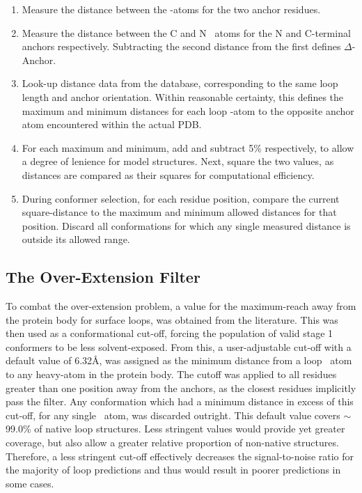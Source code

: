 \begin{enumerate} \isep
\item Measure the distance between the \ca-atoms for the two anchor residues.
\item Measure the distance between the C and N \mainchain\ atoms for the N and C-terminal anchors respectively. Subtracting the second distance from the first defines $\Delta$-Anchor.
\item Look-up distance data from the database, corresponding to the same loop length and anchor orientation. Within reasonable certainty, this defines the maximum and minimum distances for each loop \ca-atom to the opposite anchor atom encountered within the actual PDB. 
\item For each maximum and minimum, add and subtract 5\% respectively, to allow a degree of lenience for model structures. Next, square the two values, as distances are compared as their squares
for computational efficiency.\item During conformer selection, for each residue position, compare the current square-distance to the maximum and minimum allowed distances for that position. Discard all conformations for which any single measured distance is outside its allowed range.
\end{enumerate}

\subsection{The Over-Extension Filter}
\label{section:arcus:overExtFilter}

To combat the over-extension problem, a value for the maximum-reach away from the protein body for surface loops,  was obtained from the literature\cite{METHOD:Plop}. This was then used as a conformational cut-off, forcing the population of valid stage 1 conformers to be less solvent-exposed.
From this, a user-adjustable cut-off with a default value of 6.32\AA, was assigned as the minimum distance from a loop \mainchain\ atom to any heavy-atom in the protein body. The cutoff was applied to all residues greater than one position away from the anchors, as the closest residues implicitly pass the filter. Any conformation which had a minimum distance in excess of this cut-off, for any single \mainchain\ atom, was discarded outright. This default value covers $\sim$99.0\% of native loop structures. Less stringent values would provide yet greater coverage, but also allow a greater relative proportion of non-native structures. Therefore, a less stringent cut-off effectively decreases the signal-to-noise ratio for the majority of loop predictions and thus would result in poorer predictions in some cases.

